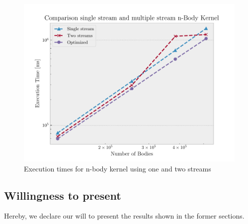 \documentclass[12pt]{article}
\begin{document}
\begin{figure}[H]
	\centering
	\includegraphics[width=0.9\linewidth]{./plot/streams.pdf}
	\caption{Execution times for n-body kernel using one and two streams}%
	\label{fig:streams}
\end{figure}

\subsection{Willingness to present}
Hereby, we declare our will to present the results shown in the former sections.
\end{document}
